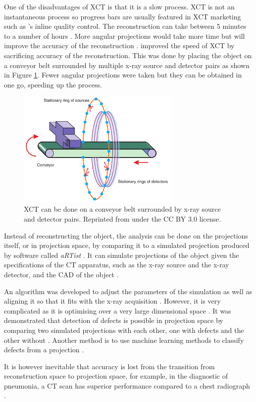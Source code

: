 One of the disadvantages of XCT is that it is a slow process. XCT is not an instantaneous process so progress bars are usually featured in XCT marketing such as \cite{nikon2015inline}'s inline quality control. The reconstruction can take between 5 minutes to a number of hours \citep{warnett2016towards}. More angular projections would take more time but will improve the accuracy of the reconstruction \citep{kruth2011computed}. \cite{warnett2016towards} improved the speed of XCT by sacrificing accuracy of the reconstruction. This was done by placing the object on a conveyor belt surrounded by multiple x-ray source and detector pairs as shown in Figure \ref{fig:literature_conveyor}. Fewer angular projections were taken but they can be obtained in one go, speeding up the process.

\begin{figure}
  \centering
  \includegraphics[width=0.7\textwidth]{../figures/literatureReview/literature_conveyor.png}
  \caption{XCT can be done on a conveyor belt surrounded by x-ray source and detector pairs. Reprinted from \cite{warnett2016towards} under the CC BY 3.0 license.}
  \label{fig:literature_conveyor}
\end{figure}

Instead of reconstructing the object, the analysis can be done on the projections itself, or in projection space, by comparing it to a simulated projection produced by software called \emph{aRTist} \citep{bellon2007artist, jaenisch2008artist, bellon2012radiographic}. It can simulate projections of the object given the specifications of the CT apparatus, such as the x-ray source and the x-ray detector, and the CAD of the object \citep{bellon2011simulation, deresch2012simulating}.

An algorithm was developed to adjust the parameters of the simulation as well as aligning it so that it fits with the x-ray acquisition \citep{brierley2018optimized}. However, it is very complicated as it is optimising over a very large dimensional space \citep{brierley2018optimized}. It was demonstrated that detection of defects is possible in projection space by comparing two simulated projections with each other, one with defects and the other without \citep{brierley2018optimized}. Another method is to use machine learning methods to classify defects from a projection \citep{rale2009comparison}.

It is however inevitable that accuracy is lost from the transition from reconstruction space to projection space, for example, in the diagnostic of pneumonia, a CT scan has superior performance compared to a chest radiograph \citep{hayden2009chest}.